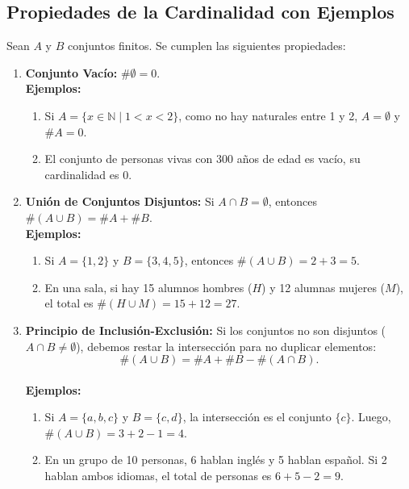 \documentclass[12pt]{article}
\begin{document}
 \subsection*{Propiedades de la Cardinalidad con Ejemplos}

Sean $A$ y $B$ conjuntos finitos. Se cumplen las siguientes propiedades:

\begin{enumerate}
    \item \textbf{Conjunto Vacío:} $\# \emptyset = 0$.\\ \textbf{Ejemplos:}
    \begin{enumerate}
        \item Si $A = \{x \in \mathbb{N} \mid 1 < x < 2\}$, como no hay naturales entre 1 y 2, $A = \emptyset$ y $\#A = 0$.
        \item El conjunto de personas vivas con 300 años de edad es vacío, su cardinalidad es 0.
    \end{enumerate}
    
    \item \textbf{Unión de Conjuntos Disjuntos:} Si $A \cap B = \emptyset$, entonces $\#(A \cup B) = \#A + \#B$.\\ \textbf{Ejemplos:}
    \begin{enumerate}
        \item Si $A = \{1, 2\}$ y $B = \{3, 4, 5\}$, entonces $\#(A \cup B) = 2 + 3 = 5$.
        \item En una sala, si hay 15 alumnos hombres ($H$) y 12 alumnas mujeres ($M$), el total es $\#(H \cup M) = 15 + 12 = 27$.
    \end{enumerate}
    
    \item \textbf{Principio de Inclusión-Exclusión:} Si los conjuntos no son disjuntos ($A \cap B \neq \emptyset$), debemos restar la intersección para no duplicar elementos:
    \[ \#(A \cup B) = \#A + \#B - \#(A \cap B). \]\\
    \textbf{Ejemplos:}
    \begin{enumerate}
        \item Si $A = \{a, b, c\}$ y $B = \{c, d\}$, la intersección es el conjunto $\{c\}$. Luego, $\#(A \cup B) = 3 + 2 - 1 = 4$.
        \item En un grupo de 10 personas, 6 hablan inglés y 5 hablan español. Si 2 hablan ambos idiomas, el total de personas es $6 + 5 - 2 = 9$.
    \end{enumerate}
    

\end{enumerate}
\end{document}
